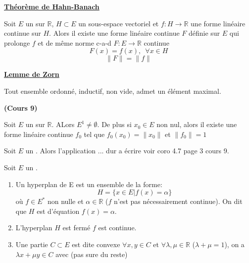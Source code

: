 \documentclass[12pt,a4paper]{article}
\begin{document}
\begin{flushleft}
\textbf{\underline{Théorème de Hahn-Banach}}
\begin{thm}
Soit $E$ un \evn sur $\mathbb{R}$, $H \subset E$ un sous-espace vectoriel et $f: H \longrightarrow \mathbb{R}$ une forme linéaire continue sur $H$. Alors il existe une forme linéaire continue $F$ définie sur $E$ qui prolonge $f$ et de même norme c-a-d $F: E \longrightarrow \mathbb{R}$ continue $$F(x) = f(x), \enspace \forall x \in H$$ $$\lVert F \rVert = \lVert f \rVert $$
\end{thm}


\textbf{\underline{Lemme de Zorn}}
\begin{lem}
Tout ensemble ordonné, inductif, non vide, admet un élément maximal.
\end{lem}

\textbf{(Cours 9)}



\begin{cor}
Soit $E$ un \evn sur $\mathbb{R}$. ALors $E^1 \neq \emptyset$. De plus si $x_0 \in E$ non nul, alors il existe une forme linéaire continue $f_0$ tel que $f_0 (x_0) = \lVert x_0 \rVert$ et $\lVert f_0 \rVert = 1$
\end{cor}

\begin{cor}
Soit $E$ un \evn . Alors l'application ... dur a écrire voir coro 4.7 page 3 cours 9.
\end{cor}

\begin{mydef}
Soit $E$ un \evn . 
\begin{enumerate}
\item Un hyperplan de E est un ensemble de la forme: $$ H = \{ x \in E | f(x) = \alpha \}$$ où $f \in E^*$ non nulle et $\alpha \in \mathbb{R}$ ($f$ n'est pas nécessairement continue). On dit que $H$ est d'équation $f(x) = \alpha$.
\item L'hyperplan $H$ est fermé \ssi $f$ est continue.
\item Une partie $C \subset E$ est dite convexe \ssi $\forall x, y \in C$ et $\forall \lambda , \mu \in \mathbb{R}$ ($\lambda + \mu = 1$), on a $\lambda x + \mu y \in C$ avec (pas sure du reste)
\end{enumerate}
\end{mydef}












































\end{flushleft}
\end{document}
